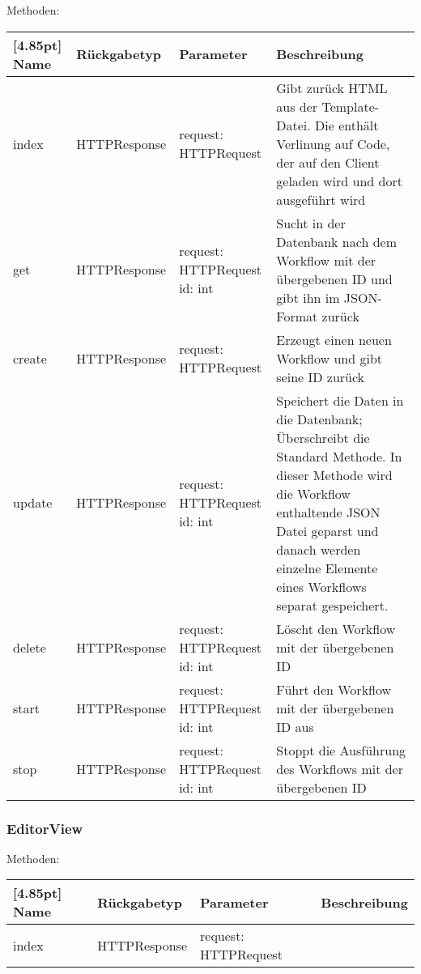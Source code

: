         Methoden:
        \begin{center}
        	\setlength\tabcolsep{5pt}
        	\renewcommand{\arraystretch}{1.5}
        	
        	\begin{tabularx}{\textwidth}{|l|l|l|X|}
        		\hline
        		\rowcolor[gray]{0.75}[4.85pt]
        		Name & Rückgabetyp & Parameter & Beschreibung \\ \hline 
        		index & HTTPResponse & request: HTTPRequest & Gibt zurück HTML aus der Template-Datei. Die enthält Verlinung auf Code, der auf den Client geladen wird und dort ausgeführt wird \\ \hline
        		get & HTTPResponse & request: \thead{HTTPRequest\\id: int} & Sucht in der Datenbank nach dem Workflow mit der übergebenen ID und gibt ihn im JSON-Format zurück \\ \hline
        		create & HTTPResponse & request: HTTPRequest & Erzeugt einen neuen Workflow und gibt seine ID zurück \\ \hline
        		update & HTTPResponse & \thead{request: HTTPRequest\\id: int} & Speichert die Daten in die Datenbank; Überschreibt die Standard Methode. In dieser Methode wird die Workflow enthaltende JSON Datei geparst und danach werden einzelne Elemente eines Workflows separat gespeichert. \\ \hline
        		delete & HTTPResponse & \thead{request: HTTPRequest\\id: int} & Löscht den Workflow mit der übergebenen ID \\ \hline
        		start & HTTPResponse & \thead{request: HTTPRequest\\id: int} & Führt den Workflow mit der übergebenen ID aus \\ \hline
        		stop & HTTPResponse & \thead{request: HTTPRequest\\id: int} & Stoppt die Ausführung des Workflows mit der übergebenen ID \\ \hline
        	\end{tabularx}
        \end{center}

		\subsubsection{EditorView}
		
		Methoden:
		\begin{center}
		    \setlength\tabcolsep{5pt}
        	\renewcommand{\arraystretch}{1.5}
            	\begin{tabularx}{\textwidth}{|l|l|l|X|}
            	\hline
            	\rowcolor[gray]{0.75}[4.85pt]
        		Name & Rückgabetyp & Parameter & Beschreibung \\ \hline 
                index & HTTPResponse & request: HTTPRequest &  \\ \hline
            	\end{tabularx}
		\end{center}
		

